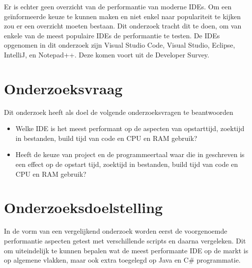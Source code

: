 Er is echter geen overzicht van de performantie van moderne IDEs. Om een geïnformeerde keuze te kunnen maken en niet enkel naar populariteit te kijken zou er een overzicht moeten bestaan. Dit onderzoek tracht dit te doen, om van enkele van de meest populaire IDEs de performantie te testen. De IDEs opgenomen in dit onderzoek zijn Visual Studio Code, Visual Studio, Eclipse, IntelliJ, en Notepad++. Deze komen voort uit de \textcite{StackOverflow2021} Developer Survey.

\newpage

\section{Onderzoeksvraag}

Dit onderzoek heeft als doel de volgende onderzoeksvragen te beantwoorden

\begin{itemize}
    \item Welke IDE is het meest performant op de aspecten van opstarttijd, zoektijd in bestanden, build tijd van code en CPU en RAM gebruik?
    \item Heeft de keuze van project en de programmeertaal waar die in geschreven is een effect op de opstart tijd, zoektijd in bestanden, build tijd van code en CPU en RAM gebruik?
\end{itemize}

\section{Onderzoeksdoelstelling}

In de vorm van een vergelijkend onderzoek worden eerst de voorgenoemde performantie aspecten getest met verschillende scripts en daarna vergeleken. Dit om uiteindelijk te kunnen bepalen wat de meest performante IDE op de markt is op algemene vlakken, maar ook extra toegelegd op Java en C\# programmatie.

\section{}
\label{sec:opzet-bachelorproef}


